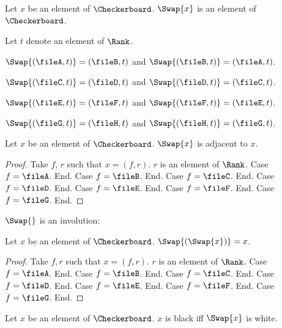\begin{forthel}
    \begin{signature}
        Let $x$ be an element of $\Checkerboard$.
        $\Swap{x}$ is an element of $\Checkerboard$.
    \end{signature}

    Let $t$ denote an element of $\Rank$.

    \begin{axiom} $\Swap{(\fileA, t)} = (\fileB, t)$ and $\Swap{(\fileB, t)} = (\fileA, t)$. \end{axiom}

    \begin{axiom} $\Swap{(\fileC, t)} = (\fileD, t)$ and $\Swap{(\fileD, t)} = (\fileC, t)$. \end{axiom}

    \begin{axiom} $\Swap{(\fileE, t)} = (\fileF, t)$ and $\Swap{(\fileF, t)} = (\fileE, t)$. \end{axiom}

    \begin{axiom} $\Swap{(\fileG, t)} = (\fileH, t)$ and $\Swap{(\fileH, t)} = (\fileG, t)$. \end{axiom}

    \begin{lemma}
        Let $x$ be an element of $\Checkerboard$.
        $\Swap{x}$ is adjacent to $x$.
    \end{lemma}
    \begin{proof}
        Take $f$, $r$ such that $x = (f, r)$.
        $r$ is an element of $\Rank$.
        Case $f = \fileA$. End.
        Case $f = \fileB$. End.
        Case $f = \fileC$. End.
        Case $f = \fileD$. End.
        Case $f = \fileE$. End.
        Case $f = \fileF$. End.
        Case $f = \fileG$. End.
    \end{proof}
\end{forthel}

$\Swap{}$ is an involution:

\begin{forthel}
    \begin{lemma}
        Let $x$ be an element of $\Checkerboard$.
        $\Swap{(\Swap{x})} = x$.
    \end{lemma}
    \begin{proof}
        Take $f, r$ such that $x = (f,r)$. $r$ is an element of $\Rank$.
        Case $f = \fileA$. End.
        Case $f = \fileB$. End.
        Case $f = \fileC$. End.
        Case $f = \fileD$. End.
        Case $f = \fileE$. End.
        Case $f = \fileF$. End.
        Case $f = \fileG$. End.
    \end{proof}

    \begin{lemma}
        Let $x$ be an element of $\Checkerboard$.
        $x$ is black iff $\Swap{x}$ is white.
    \end{lemma}
\end{forthel}

